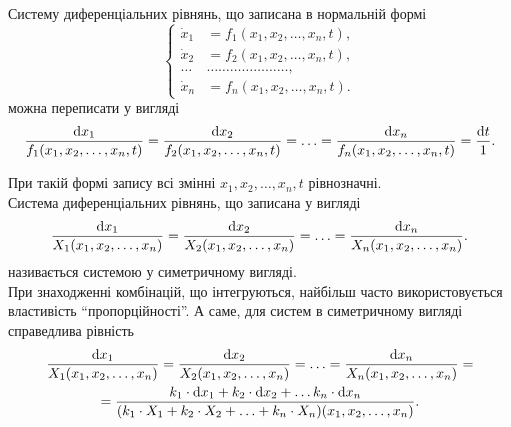 Систему диференціальних рівнянь, що записана в нормальній формі
\begin{equation*}
	\left\{
		\begin{aligned}
			\dot x_1 &= f_1 (x_1, x_2, \ldots, x_n, t), \\
			\dot x_2 &= f_2 (x_1, x_2, \ldots, x_n, t), \\
			\ldots & \ldots \ldots \ldots \ldots \ldots \ldots \ldots, \\
			\dot x_n &= f_n (x_1, x_2, \ldots, x_n, t).
		\end{aligned}
	\right.
\end{equation*}
можна переписати у вигляді
\begin{equation*}
	\frac{\mathop{}\!\mathrm{d} x_1}{f_1(x_1, x_2, \ldots, x_n, t)} = \frac{\mathop{}\!\mathrm{d} x_2}{f_2 (x_1, x_2, \ldots, x_n, t)} = \ldots = \frac{\mathop{}\!\mathrm{d} x_n}{f_n (x_1, x_2, \ldots, x_n, t)} = \frac{\mathop{}\!\mathrm{d} t}{1}.
\end{equation*}

При такій формі запису всі змінні $x_1, x_2, \ldots, x_n, t$ рівнозначні. \\

Система диференціальних рівнянь, що записана у вигляді
\begin{equation*}
	\frac{\mathop{}\!\mathrm{d} x_1}{X_1(x_1, x_2, \ldots, x_n)} = \frac{\mathop{}\!\mathrm{d} x_2}{X_2 (x_1, x_2, \ldots, x_n)} = \ldots = \frac{\mathop{}\!\mathrm{d} x_n}{X_n (x_1, x_2, \ldots, x_n)}.
\end{equation*}
називається системою у симетричному вигляді. \\

При знаходженні комбінацій, що інтегруються, найбільш часто використовується властивість ``пропорційності''. А саме, для систем в симетричному вигляді справедлива рівність
\begin{multline*}
	\frac{\mathop{}\!\mathrm{d} x_1}{X_1(x_1, x_2, \ldots, x_n)} = \frac{\mathop{}\!\mathrm{d} x_2}{X_2 (x_1, x_2, \ldots, x_n)} = \ldots = \frac{\mathop{}\!\mathrm{d} x_n}{X_n (x_1, x_2, \ldots, x_n)} = \\
	= \frac{k_1 \cdot \mathop{}\!\mathrm{d} x_1 + k_2 \cdot \mathop{}\!\mathrm{d} x_2 + \ldots k_n \cdot \mathop{}\!\mathrm{d} x_n}{(k_1 \cdot X_1  + k_2 \cdot X_2  + \ldots + k_n \cdot X_n) (x_1, x_2, \ldots, x_n)}.
\end{multline*}
